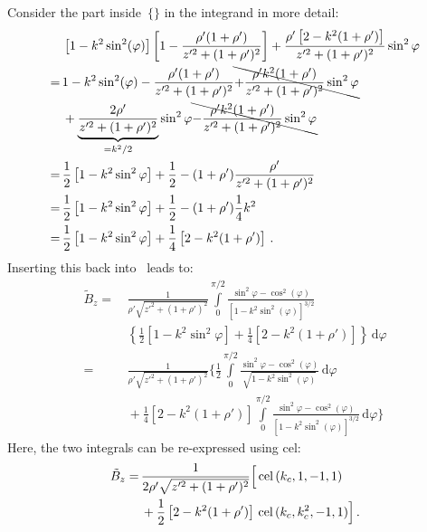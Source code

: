 Consider the part inside~$\{\}$ in the integrand in more detail:
\begin{align}
 ~&\,   \left[1 - k^2 \sin^2(\varphi)\right] \left[1 - \frac{\rho'(1 + \rho')}{z'^2 + (1 + \rho')^2} \right]
      + \frac{\rho'\left[2 - k^2(1+\rho')\right]}{z'^2 + (1 + \rho')^2} \sin^2{\varphi} \nonumber \\
 =&\, 1 - k^2 \sin^2(\varphi) - \frac{\rho'(1 + \rho')}{z'^2 + (1 + \rho')^2}
        \bcancel{+\frac{\rho' k^2 (1 + \rho')}{z'^2 + (1 + \rho')^2} \sin^2{\varphi}} \nonumber \\
 ~&\,   + \underbrace{\frac{2 \rho'}{z'^2 + (1 + \rho')^2}}_{=k^2/2} \sin^2{\varphi}
        \bcancel{-\frac{\rho' k^2 (1+\rho')}{z'^2 + (1 + \rho')^2} \sin^2{\varphi}} \nonumber \\
 =&\, \frac{1}{2} \left[1 - k^2 \sin^2{\varphi} \right] + \frac{1}{2} - (1+\rho') \frac{\rho'}{z'^2 + (1 + \rho')^2} \nonumber \\
 =&\, \frac{1}{2} \left[1 - k^2 \sin^2{\varphi} \right] + \frac{1}{2} - (1+\rho') \frac{1}{4} k^2 \nonumber \\
 =&\, \frac{1}{2} \left[1 - k^2 \sin^2{\varphi} \right] + \frac{1}{4} \left[2 - k^2 (1+\rho') \right] \, .
\end{align}
Inserting this back into~ leads to:
\begin{align}
 \tilde{B}_z
 =&\, \frac{1}{\rho' \sqrt{z'^2 + (1 + \rho')^2}}
      \int\limits_0^{\pi/2}
        \frac{\sin^2{\varphi} - \cos^2(\varphi)}{\left[1 - k^2 \sin^2(\varphi)\right]^{3/2}} \nonumber \\
 ~&\, \left\{ \frac{1}{2} \left[1 - k^2 \sin^2{\varphi} \right] + \frac{1}{4} \left[2 - k^2 (1+\rho') \right] \right\} \,\mathrm{d}\varphi \nonumber \\
 =&\, \frac{1}{\rho' \sqrt{z'^2 + (1 + \rho')^2}} \Biggl\{
          \frac{1}{2} \int\limits_0^{\pi/2} \frac{\sin^2{\varphi} - \cos^2(\varphi)}{\sqrt{1 - k^2 \sin^2(\varphi)}} \,\mathrm{d}\varphi \nonumber \\
 ~&\, + \frac{1}{4} \left[2 - k^2 (1+\rho') \right] \int\limits_0^{\pi/2}
        \frac{\sin^2{\varphi} - \cos^2(\varphi)}{\left[1 - k^2 \sin^2(\varphi)\right]^{3/2}} \,\mathrm{d}\varphi \Biggr\}
\end{align}
Here, the two integrals can be re-expressed using cel:
\begin{align}
 \tilde{B}_z
 =&\, \frac{1}{2 \rho' \sqrt{z'^2 + (1 + \rho')^2}} \Bigl[ \,\textrm{cel}\,(k_c, 1, -1, 1) \nonumber \\
 ~&\, + \frac{1}{2} \left[2 - k^2 (1+\rho') \right] \,\textrm{cel}\,(k_c, k_c^2, -1, 1) \Bigr] \, . \label{eqn:cwl_B_z_teal}
\end{align}
